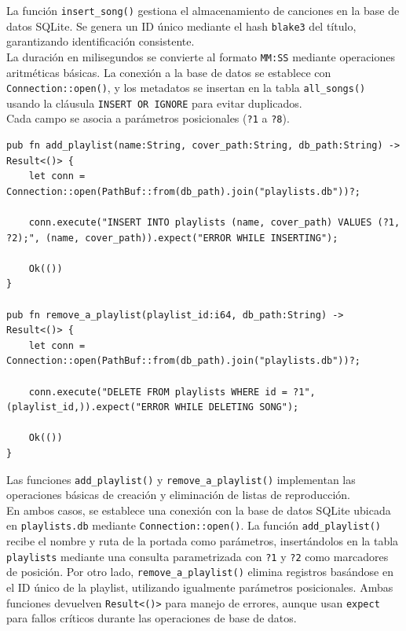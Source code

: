 \documentclass[11pt, a4paper]{article}
\begin{document}
            La función \texttt{insert\_song()} gestiona el almacenamiento de canciones en la base de datos SQLite. Se genera un ID único mediante el hash \texttt{blake3} del título, garantizando identificación consistente. \\
            
            La duración en milisegundos se convierte al formato \texttt{MM:SS} mediante operaciones aritméticas básicas. La conexión a la base de datos se establece con \texttt{Connection::open()}, y los metadatos se insertan en la tabla \texttt{all\_songs()} usando la cláusula \texttt{INSERT OR IGNORE} para evitar duplicados. \\
            
            Cada campo se asocia a parámetros posicionales (\texttt{?1} a \texttt{?8}). \newpage

            \begin{lstlisting}[caption={Operaciones CRUD playlist}]
pub fn add_playlist(name:String, cover_path:String, db_path:String) -> Result<()> {
    let conn = Connection::open(PathBuf::from(db_path).join("playlists.db"))?;

    conn.execute("INSERT INTO playlists (name, cover_path) VALUES (?1, ?2);", (name, cover_path)).expect("ERROR WHILE INSERTING");

    Ok(())
}

pub fn remove_a_playlist(playlist_id:i64, db_path:String) -> Result<()> {
    let conn = Connection::open(PathBuf::from(db_path).join("playlists.db"))?;

    conn.execute("DELETE FROM playlists WHERE id = ?1",(playlist_id,)).expect("ERROR WHILE DELETING SONG");

    Ok(())
}
            \end{lstlisting}

            Las funciones \texttt{add\_playlist()} y \texttt{remove\_a\_playlist()} implementan las operaciones básicas de creación y eliminación de listas de reproducción. \\
            
            En ambos casos, se establece una conexión con la base de datos SQLite ubicada en \texttt{playlists.db} mediante \texttt{Connection::open()}. La función \texttt{add\_playlist()} recibe el nombre y ruta de la portada como parámetros, insertándolos en la tabla \texttt{playlists} mediante una consulta parametrizada con \texttt{?1} y \texttt{?2} como marcadores de posición. Por otro lado, \texttt{remove\_a\_playlist()} elimina registros basándose en el ID único de la playlist, utilizando igualmente parámetros posicionales. Ambas funciones devuelven \texttt{Result<()>} para manejo de errores, aunque usan \texttt{expect} para fallos críticos durante las operaciones de base de datos. \newpage
\end{document}
